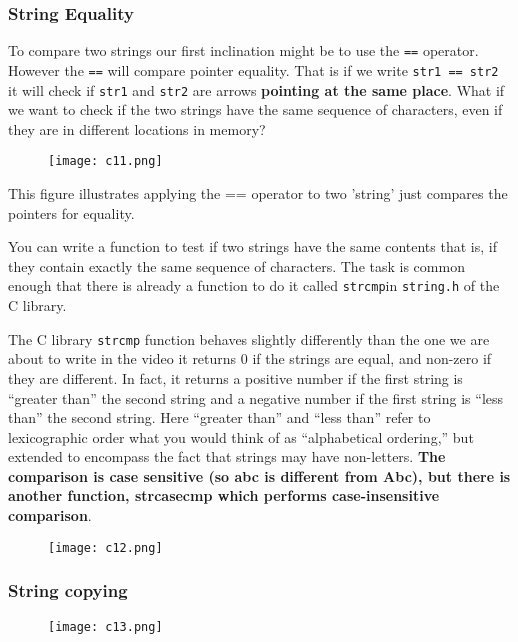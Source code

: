 \documentclass[12pt,a4paper]{article}
\begin{document}
\subsubsection{String Equality}

To compare two strings our first inclination might be to use the \verb|==|
operator. However the \verb|==| will compare pointer equality. That is if we
write \verb|str1 == str2| it will check if \verb|str1| and \verb|str2| are
arrows \textbf{pointing at the same place}. What if we want to check if the two
strings have the same sequence of characters, even if they are in different
locations in memory?

 
\begin{figure}[!htbp]
	\centering
	\texttt{[image: c11.png]}
\end{figure}
This figure illustrates applying the == operator to two ’string’ just compares the pointers for equality.

You can write a function to test if two strings have the same contents that is,
if they contain exactly the same sequence of characters. The task is common
enough that there is already a function to do it called \verb|strcmp|in
\verb|string.h| of the C library. 

The C library \verb|strcmp| function behaves slightly differently than the one
we are about to write in the video it returns 0 if the strings are equal, and
non-zero if they are different. In fact, it returns a positive number if the
first string is “greater than” the second string and a negative number if the
first string is “less than” the second string. Here “greater than” and “less
than” refer to lexicographic order  what you would think of as “alphabetical
ordering,” but extended to encompass the fact that strings may have
non-letters. \textbf{The comparison is case sensitive (so abc is different from
Abc), but there is another function, strcasecmp which performs case-insensitive
comparison}.

\begin{figure}[!htbp]
	\centering
	\texttt{[image: c12.png]}
\end{figure}

\subsubsection{String copying}


\begin{figure}[!htbp]
	\centering
	\texttt{[image: c13.png]}
\end{figure}
\end{document}
